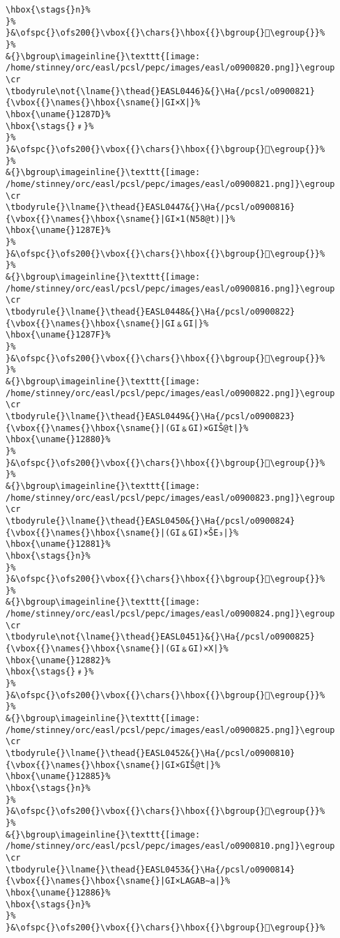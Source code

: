 \begin{verbatim}
\hbox{\stags{}n}%
}%
}&\ofspc{}\ofs200{}\vbox{{}\chars{}\hbox{{}\bgroup{}𒡼\egroup{}}%
}%
&{}\bgroup\imageinline{}\texttt{[image: /home/stinney/orc/easl/pcsl/pepc/images/easl/o0900820.png]}\egroup
\cr
\tbodyrule\not{\lname{}\thead{}EASL0446}&{}\Ha{/pcsl/o0900821}{\vbox{{}\names{}\hbox{\sname{}|GI×X|}%
\hbox{\uname{}1287D}%
\hbox{\stags{}﹟}%
}%
}&\ofspc{}\ofs200{}\vbox{{}\chars{}\hbox{{}\bgroup{}𒡽\egroup{}}%
}%
&{}\bgroup\imageinline{}\texttt{[image: /home/stinney/orc/easl/pcsl/pepc/images/easl/o0900821.png]}\egroup
\cr
\tbodyrule{}\lname{}\thead{}EASL0447&{}\Ha{/pcsl/o0900816}{\vbox{{}\names{}\hbox{\sname{}|GI×1(N58@t)|}%
\hbox{\uname{}1287E}%
}%
}&\ofspc{}\ofs200{}\vbox{{}\chars{}\hbox{{}\bgroup{}𒡾\egroup{}}%
}%
&{}\bgroup\imageinline{}\texttt{[image: /home/stinney/orc/easl/pcsl/pepc/images/easl/o0900816.png]}\egroup
\cr
\tbodyrule{}\lname{}\thead{}EASL0448&{}\Ha{/pcsl/o0900822}{\vbox{{}\names{}\hbox{\sname{}|GI﹠GI|}%
\hbox{\uname{}1287F}%
}%
}&\ofspc{}\ofs200{}\vbox{{}\chars{}\hbox{{}\bgroup{}𒡿\egroup{}}%
}%
&{}\bgroup\imageinline{}\texttt{[image: /home/stinney/orc/easl/pcsl/pepc/images/easl/o0900822.png]}\egroup
\cr
\tbodyrule{}\lname{}\thead{}EASL0449&{}\Ha{/pcsl/o0900823}{\vbox{{}\names{}\hbox{\sname{}|(GI﹠GI)×GIŠ@t|}%
\hbox{\uname{}12880}%
}%
}&\ofspc{}\ofs200{}\vbox{{}\chars{}\hbox{{}\bgroup{}𒢀\egroup{}}%
}%
&{}\bgroup\imageinline{}\texttt{[image: /home/stinney/orc/easl/pcsl/pepc/images/easl/o0900823.png]}\egroup
\cr
\tbodyrule{}\lname{}\thead{}EASL0450&{}\Ha{/pcsl/o0900824}{\vbox{{}\names{}\hbox{\sname{}|(GI﹠GI)×ŠE₃|}%
\hbox{\uname{}12881}%
\hbox{\stags{}n}%
}%
}&\ofspc{}\ofs200{}\vbox{{}\chars{}\hbox{{}\bgroup{}𒢁\egroup{}}%
}%
&{}\bgroup\imageinline{}\texttt{[image: /home/stinney/orc/easl/pcsl/pepc/images/easl/o0900824.png]}\egroup
\cr
\tbodyrule\not{\lname{}\thead{}EASL0451}&{}\Ha{/pcsl/o0900825}{\vbox{{}\names{}\hbox{\sname{}|(GI﹠GI)×X|}%
\hbox{\uname{}12882}%
\hbox{\stags{}﹟}%
}%
}&\ofspc{}\ofs200{}\vbox{{}\chars{}\hbox{{}\bgroup{}𒢂\egroup{}}%
}%
&{}\bgroup\imageinline{}\texttt{[image: /home/stinney/orc/easl/pcsl/pepc/images/easl/o0900825.png]}\egroup
\cr
\tbodyrule{}\lname{}\thead{}EASL0452&{}\Ha{/pcsl/o0900810}{\vbox{{}\names{}\hbox{\sname{}|GI×GIŠ@t|}%
\hbox{\uname{}12885}%
\hbox{\stags{}n}%
}%
}&\ofspc{}\ofs200{}\vbox{{}\chars{}\hbox{{}\bgroup{}𒢅\egroup{}}%
}%
&{}\bgroup\imageinline{}\texttt{[image: /home/stinney/orc/easl/pcsl/pepc/images/easl/o0900810.png]}\egroup
\cr
\tbodyrule{}\lname{}\thead{}EASL0453&{}\Ha{/pcsl/o0900814}{\vbox{{}\names{}\hbox{\sname{}|GI×LAGAB∼a|}%
\hbox{\uname{}12886}%
\hbox{\stags{}n}%
}%
}&\ofspc{}\ofs200{}\vbox{{}\chars{}\hbox{{}\bgroup{}𒢆\egroup{}}%

\end{verbatim}
